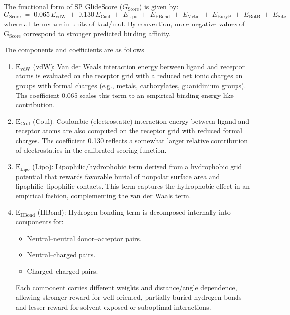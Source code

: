 \documentclass[12pt, a4paper]{article}
\begin{document}
The functional form of SP GlideScore (\(G_{\text{Score}}\)) is given by:
\[
  G_{\text{Score}} \;=\; 0.065\,E_{\text{vdW}} \;+\; 0.130\,E_{\text{Coul}} \;+\; E_{\text{Lipo}} \;+\; E_{\text{HBond}} \;+\; E_{\text{Metal}} \;+\; E_{\text{BuryP}} \;+\; E_{\text{RotB}} \;+\; E_{\text{Site}}
\]
where all terms are in units of kcal/mol. By convention, more negative values of $\text{G}_{\text{Score}}$ correspond to stronger predicted binding affinity. 

The components and coefficients are as follows
\begin{enumerate}
  \item $\text{E}_{\text{vdW}}$ (vdW): Van der Waals interaction energy between ligand and receptor atoms is evaluated on the receptor grid with a reduced net ionic charges on groups with formal charges (e.g., metals, carboxylates, guanidinium groups). The coefficient 0.065 scales this term to an empirical binding energy like contribution. 

  \item $\text{E}_{\text{Coul}}$ (Coul): Coulombic (electrostatic) interaction energy between ligand and receptor atoms are also computed on the receptor grid with reduced formal charges. The coefficient 0.130 reflects a somewhat larger relative contribution of electrostatics in the calibrated scoring function.

  \item $\text{E}_{\text{Lipo}}$ (Lipo): Lipophilic/hydrophobic term derived from a hydrophobic grid potential that rewards favorable burial of nonpolar surface area and lipophilic–lipophilic contacts. This term captures the hydrophobic effect in an empirical fashion, complementing the van der Waals term.

  \item $\text{E}_{\text{HBond}}$ (HBond): Hydrogen-bonding term is decomposed internally into components for:
    \begin{itemize}
      \item Neutral–neutral donor–acceptor pairs.
      \item Neutral–charged pairs.
      \item Charged–charged pairs.
    \end{itemize}

    Each component carries different weights and distance/angle dependence, allowing stronger reward for well-oriented, partially buried hydrogen bonds and lesser reward for solvent-exposed or suboptimal interactions.


\end{enumerate}
\end{document}
